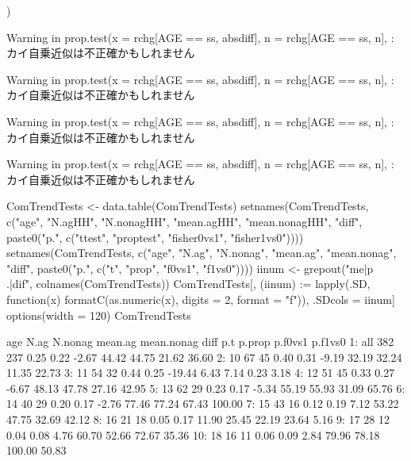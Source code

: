 \begin{Schunk}
\begin{Sinput}
{  )
}
\end{Sinput}
\begin{Soutput}
Warning in prop.test(x = rchg[AGE == ss, absdiff], n = rchg[AGE == ss, n], :  カイ自乗近似は不正確かもしれません 
\end{Soutput}
\begin{Soutput}
Warning in prop.test(x = rchg[AGE == ss, absdiff], n = rchg[AGE == ss, n], :  カイ自乗近似は不正確かもしれません 
\end{Soutput}
\begin{Soutput}
Warning in prop.test(x = rchg[AGE == ss, absdiff], n = rchg[AGE == ss, n], :  カイ自乗近似は不正確かもしれません 
\end{Soutput}
\begin{Soutput}
Warning in prop.test(x = rchg[AGE == ss, absdiff], n = rchg[AGE == ss, n], :  カイ自乗近似は不正確かもしれません 
\end{Soutput}
\begin{Sinput}
ComTrendTests <- data.table(ComTrendTests)
setnames(ComTrendTests, c("age", 
  "N.agHH", "N.nonagHH", "mean.agHH", "mean.nonagHH", "diff",
  paste0("p.", c("ttest", "proptest", "fisher0vs1", "fisher1vs0"))))
setnames(ComTrendTests, c("age", 
  "N.ag", "N.nonag", "mean.ag", "mean.nonag", "diff",
  paste0("p.", c("t", "prop", "f0vs1", "f1vs0"))))
iinum <- grepout("me|p\\.|dif", colnames(ComTrendTests))
ComTrendTests[, (iinum) := lapply(.SD, function(x) formatC(as.numeric(x), digits = 2, format = "f")), 
  .SDcols = iinum]
options(width = 120)
ComTrendTests
\end{Sinput}
\begin{Soutput}
    age N.ag N.nonag mean.ag mean.nonag   diff   p.t p.prop p.f0vs1 p.f1vs0
 1: all  382     237    0.25       0.22  -2.67 44.42  44.75   21.62   36.60
 2:  10   67      45    0.40       0.31  -9.19 32.19  32.24   11.35   22.73
 3:  11   54      32    0.44       0.25 -19.44  6.43   7.14    0.23    3.18
 4:  12   51      45    0.33       0.27  -6.67 48.13  47.78   27.16   42.95
 5:  13   62      29    0.23       0.17  -5.34 55.19  55.93   31.09   65.76
 6:  14   40      29    0.20       0.17  -2.76 77.46  77.24   67.43  100.00
 7:  15   43      16    0.12       0.19   7.12 53.22  47.75   32.69   42.12
 8:  16   21      18    0.05       0.17  11.90 25.45  22.19   23.64    5.16
 9:  17   28      12    0.04       0.08   4.76 60.70  52.66   72.67   35.36
10:  18   16      11    0.06       0.09   2.84 79.96  78.18  100.00   50.83
\end{Soutput}
\end{Schunk}



